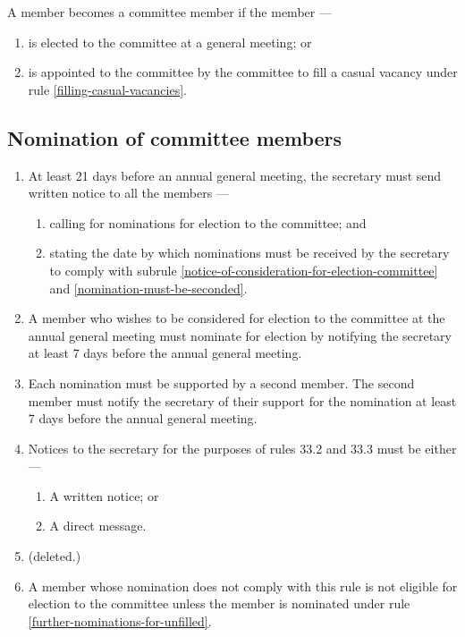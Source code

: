 \documentclass[../constitution.tex]{subfiles}
\begin{document}
A member becomes a committee member if the member ---

\begin{enumerate}

\item is elected to the committee at a general meeting; or
\item is appointed to the committee by the committee to fill a casual vacancy under rule \ref{filling-casual-vacancies}.
\end{enumerate}

\hypertarget{nomination-of-committee-members}{%
\subsection{Nomination of committee members}\label{nomination-of-committee-members}}

\begin{enumerate}

\item At least 21 days before an annual general meeting, the secretary must send written notice to all the members ---

  \begin{enumerate}
  
  \item calling for nominations for election to the committee; and
  \item stating the date by which nominations must be received by the secretary to comply with subrule \ref{notice-of-consideration-for-election-committee} and \ref{nomination-must-be-seconded}.
  \end{enumerate}
\item A member who wishes to be considered for election to the committee at the annual general meeting must nominate for election by notifying the secretary at least 7 days before the annual general meeting. \label{notice-of-consideration-for-election-committee}
\item Each nomination must be supported by a second member. The second member must notify the secretary of their support for the nomination at least 7 days before the annual general meeting. \label{nomination-must-be-seconded}
\item Notices to the secretary for the purposes of rules 33.2 and 33.3 must be either ---

  \begin{enumerate}
    \item A written notice; or
    \item A direct message.
  \end{enumerate}

\item (deleted.)
\item A member whose nomination does not comply with this rule is not eligible for election to the committee unless the member is nominated under rule \ref{further-nominations-for-unfilled}. 
\end{enumerate}
\end{document}
